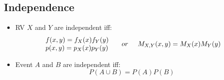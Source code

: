 \documentclass[12pt]{article}
\begin{document}
\begin{multicols*}{4}
    \section{Independence}
    \begin{tcolorbox}[title=Independence]
        \begin{itemize}[leftmargin=*]
            \item RV $X$ and $Y$ are independent iff:
                  $$\begin{array}{l}f(x, y)=f_X(x)f_Y(y)\\p(x, y)=p_X(x)p_Y(y)\end{array}\hspace{0.5cm}or\hspace{0.5cm}M_{X, Y}(x, y)=M_X(x)M_Y(y)$$
            \item Event $A$ and $B$ are independent iff:
                  $$P(A\cup B)=P(A)P(B)$$
        \end{itemize}
    \end{tcolorbox}

\end{multicols*}
\end{document}
